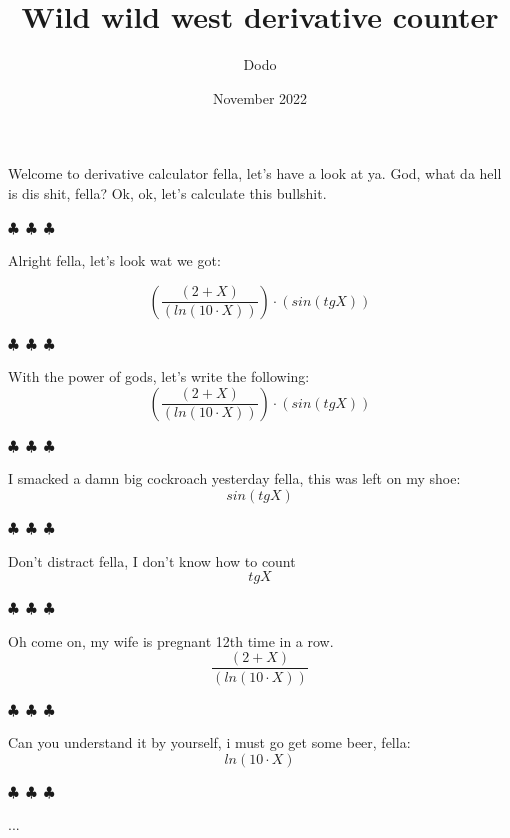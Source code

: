 \documentclass{article}
\title{Wild wild west derivative counter}
\author{Dodo}
\date{November 2022}
\begin{document}
    \maketitle
    
        Welcome to derivative calculator fella, let's have a look at ya. God, what da hell is dis shit, fella?
        Ok, ok, let's calculate this bullshit.

        \begin{center}
        $\clubsuit$~$\clubsuit$~$\clubsuit$
        \end{center}
    Alright fella, let's look wat we got:

\begin{equation}
{({\frac{({{2}+{X}})}{({ln({{10}\cdot{X}})})}})\cdot({sin({tg{X}})})}
\end{equation}
\begin{center} $\clubsuit$~$\clubsuit$~$\clubsuit$ \end{center}With the power of gods, let's write the following:
\begin{equation}
{({\frac{({{2}+{X}})}{({ln({{10}\cdot{X}})})}})\cdot({sin({tg{X}})})}
\end{equation}
\begin{center} $\clubsuit$~$\clubsuit$~$\clubsuit$ \end{center}I smacked a damn big cockroach yesterday fella, this was left on my shoe:
\begin{equation}
{sin({tg{X}})}
\end{equation}
\begin{center} $\clubsuit$~$\clubsuit$~$\clubsuit$ \end{center}Don't distract fella, I don't know how to count
\begin{equation}
{tg{X}}
\end{equation}
\begin{center} $\clubsuit$~$\clubsuit$~$\clubsuit$ \end{center}Oh come on, my wife is pregnant 12th time in a row.
\begin{equation}
{\frac{({{2}+{X}})}{({ln({{10}\cdot{X}})})}}
\end{equation}
\begin{center} $\clubsuit$~$\clubsuit$~$\clubsuit$ \end{center}Can you understand it by yourself, i must go get some beer, fella:
\begin{equation}
{ln({{10}\cdot{X}})}
\end{equation}
\begin{center} $\clubsuit$~$\clubsuit$~$\clubsuit$ \end{center}...
\end{document}
